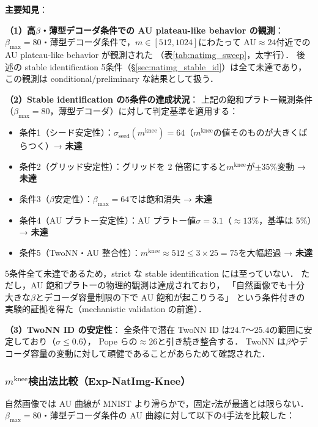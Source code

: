 \documentclass[11pt,a4paper]{jsarticle}
\newcommand{\mknee}{m^{\mathrm{knee}}}
\begin{document}
\textbf{主要知見}：

\textbf{（1）高$\beta$・薄型デコーダ条件での AU plateau-like behavior の観測}：
$\beta_{\max}=80$・薄型デコーダ条件で，$m \in [512, 1024]$にわたって
AU$\approx 24$付近での AU plateau-like behavior が観測された
（表\ref{tab:natimg_sweep}，太字行）．
後述の stable identification 5条件（§\ref{sec:natimg_stable_id}）は全て未達であり，
この観測は conditional/preliminary な結果として扱う．

\textbf{（2）Stable identification の5条件の達成状況}：
上記の飽和プラトー観測条件（$\beta_{\max}=80$，薄型デコーダ）に対して判定基準を適用する：
\begin{itemize}
  \item 条件1（シード安定性）：$\sigma_\mathrm{seed}(\mknee) = 64$（$\mknee$の値そのものが大きくばらつく）→ \textbf{未達}
  \item 条件2（グリッド安定性）：グリッドを 2 倍密にすると$\mknee$が$\pm 35\%$変動 → \textbf{未達}
  \item 条件3（$\beta$安定性）：$\beta_{\max}=64$では飽和消失 → \textbf{未達}
  \item 条件4（AU プラトー安定性）：AU プラトー値$\sigma = 3.1$（$\approx 13\%$，基準は 5\%）→ \textbf{未達}
  \item 条件5（TwoNN・AU 整合性）：$\mknee \approx 512 \leq 3 \times 25 = 75$を大幅超過 → \textbf{未達}
\end{itemize}
5条件全て未達であるため，strict な stable identification には至っていない．
ただし，AU 飽和プラトーの物理的観測は達成されており，
「自然画像でも十分大きな$\beta$とデコーダ容量制限の下で AU 飽和が起こりうる」
という条件付きの実験的証拠を得た（mechanistic validation の前進）．

\textbf{（3）TwoNN ID の安定性}：
全条件で潜在 TwoNN ID は$24.7$〜$25.4$の範囲に安定しており（$\sigma \leq 0.6$），
Pope ら\cite{pope2021intrinsic}の$\approx26$と引き続き整合する．
TwoNN は$\beta$やデコーダ容量の変動に対して頑健であることがあらためて確認された．

\subsubsection*{$\mknee$検出法比較（Exp-NatImg-Knee）}\label{sec:exp_natimg_knee}

自然画像では AU 曲線が MNIST より滑らかで，固定$\tau$法が最適とは限らない．
$\beta_{\max}=80$・薄型デコーダ条件の AU 曲線に対して以下の4手法を比較した：
\end{document}
